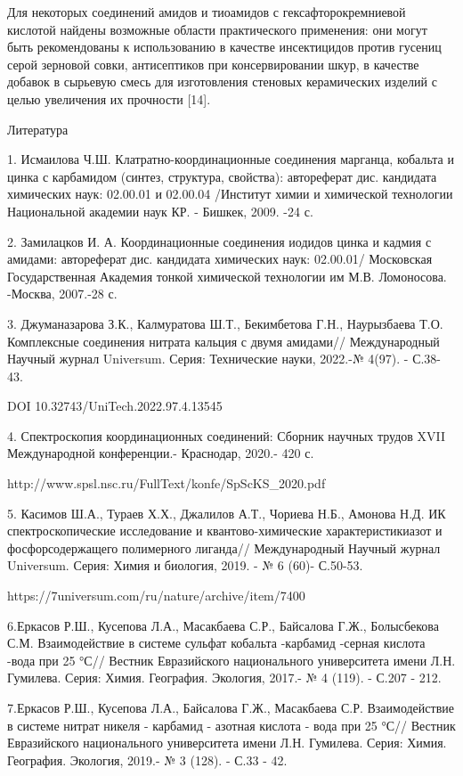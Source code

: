 Для некоторых соединений амидов и тиоамидов с гексафторокремниевой
кислотой найдены возможные области практического применения: они могут
быть рекомендованы к использованию в качестве инсектицидов против
гусениц серой зерновой совки, антисептиков при консервировании шкур, в
качестве добавок в сырьевую смесь для изготовления стеновых керамических
изделий с целью увеличения их прочности {[}14{]}.

Литература

1. Исмаилова Ч.Ш. Клатратно-координационные соединения марганца,
кобальта и цинка с карбамидом (синтез, структура, свойства): автореферат
дис. кандидата химических наук: 02.00.01 и 02.00.04 /Институт химии и
химической технологии Национальной академии наук КР. - Бишкек, 2009. -24
с.

2. Замилацков И. А. Координационные соединения иодидов цинка и кадмия с
амидами: автореферат дис. кандидата химических наук: 02.00.01/
Московская Государственная Академия тонкой химической технологии им М.В.
Ломоносова. -Москва, 2007.-28 с.

3. Джуманазарова З.К., Калмуратова Ш.Т., Бекимбетова Г.Н., Наурызбаева
Т.О. Комплексные соединения нитрата кальция с двумя амидами//
Международный Научный журнал Universum. Серия: Технические науки,
2022.-№ 4(97). - С.38-43.

DOI 10.32743/UniTech.2022.97.4.13545

4. Спектроскопия координационных соединений: Сборник научных трудов XVII
Международной конференции.- Краснодар, 2020.- 420 с.

http://www.spsl.nsc.ru/FullText/konfe/SpScKS\_2020.pdf

5. Касимов Ш.А., Тураев Х.Х., Джалилов А.Т., Чориева Н.Б., Амонова Н.Д.
ИК спектроскопические исследование и квантово-химические
характеристикиазот и фосфорсодержащего полимерного лиганда//
Международный Научный журнал Universum. Серия: Химия и биология, 2019. -
№ 6 (60)- С.50-53.

https://7universum.com/ru/nature/archive/item/7400

6.Еркасов Р.Ш., Кусепова Л.А., Масакбаева С.Р., Байсалова Г.Ж.,
Болысбекова С.М. Взаимодействие в системе сульфат кобальта -карбамид
-серная кислота -вода при 25 °С// Вестник Евразийского национального
университета имени Л.Н. Гумилева. Серия: Химия. География. Экология,
2017.- № 4 (119). - С.207 - 212.

7.Еркасов Р.Ш., Кусепова Л.А., Байсалова Г.Ж., Масакбаева С.Р.
Взаимодействие в системе нитрат никеля - карбамид - азотная кислота -
вода при 25 °С// Вестник Евразийского национального университета имени
Л.Н. Гумилева. Серия: Химия. География. Экология, 2019.- № 3 (128). -
С.33 - 42.

